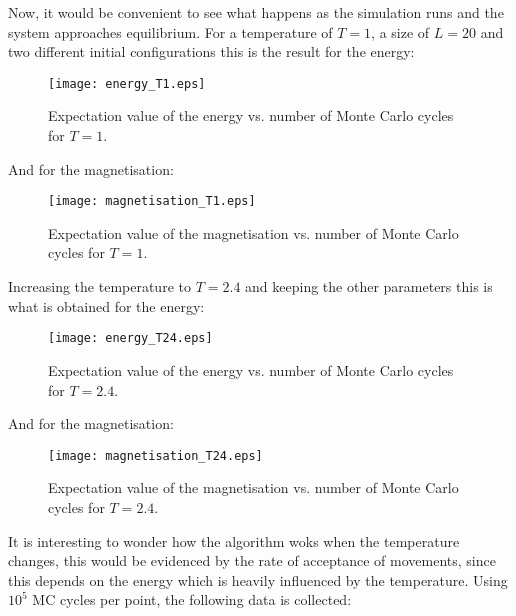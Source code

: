 \documentclass[11pt,a4paper,oneside]{article}
\begin{document}
		Now, it would be convenient to see what happens as the simulation runs and the system approaches equilibrium. For a temperature of $T=1$, a size of $L=20$ and two different initial configurations this is the result for the energy:\newpage
		
		\begin{figure}[ht!]\begin{center}\texttt{[image: energy\_T1.eps]}\par\protect\caption{\scriptsize Expectation value of the energy vs. number of Monte Carlo cycles for $T=1$.}\end{center}\end{figure}
		
		And for the magnetisation:\\
		
		\begin{figure}[ht!]\begin{center}\texttt{[image: magnetisation\_T1.eps]}\par\protect\caption{\scriptsize Expectation value of the magnetisation vs. number of Monte Carlo cycles for $T=1$.}\end{center}\end{figure}
		
		Increasing the temperature to $T=2.4$ and keeping the other parameters this is what is obtained for the energy:\\
		
		\begin{figure}[ht!]\begin{center}\texttt{[image: energy\_T24.eps]}\par\protect\caption{\scriptsize Expectation value of the energy vs. number of Monte Carlo cycles for $T=2.4$.}\end{center}\end{figure}
		
		And for the magnetisation:\\
		
		\begin{figure}[ht!]\begin{center}\texttt{[image: magnetisation\_T24.eps]}\par\protect\caption{\scriptsize Expectation value of the magnetisation vs. number of Monte Carlo cycles for $T=2.4$.}\end{center}\end{figure}
		
		It is interesting to wonder how the algorithm woks when the temperature changes, this would be evidenced by the rate of acceptance of movements, since this depends on the energy which is heavily influenced by the temperature. Using $10^5$ MC cycles per point, the following data is collected:\vspace{2.5 cm}
		
\end{document}
